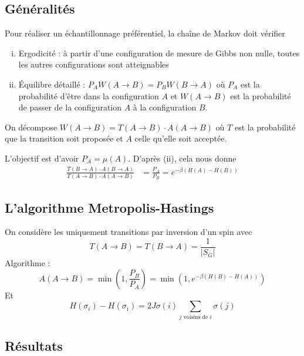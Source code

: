\documentclass[french]{beamer}
\begin{document}
\subsection{Généralités}

\begin{frame}
Pour réaliser un échantillonnage préférentiel, la chaîne de Markov doit vérifier
\begin{enumerate}[(i)]
	\item Ergodicité : à partir d'une configuration de mesure de Gibbs non nulle, toutes les autres configurations sont atteignables
	\item \'Equilibre détaillé : $P_AW(A \to B) = P_BW(B \to A)$ où $P_A$ est la probabilité d'être dans la configuration $A$ et $W(A \to B)$ est la probabilité de passer de la configuration $A$ à la configuration $B$.
\end{enumerate}
On décompose $W(A \to B) = T(A \to B) \cdot A(A \to B)$ où $T$ est la probabilité que la transition soit proposée et $A$ celle qu'elle soit acceptée.

L'objectif est d'avoir $P_A = \mu(A)$. D'après (ii), cela nous donne 
\begin{align*}
\frac{T(B \to A)\cdot A(B \to A)}{T(A\to B)\cdot A(A \to B)} &= \frac{P_A}{P_B} = e^{-\beta\left(H(A) - H(B)\right)}
\end{align*}
\end{frame}

%
\subsection{L'algorithme Metropolis-Hastings}
%

\begin{frame}
	On considère les uniquement transitions par inversion d'un spin avec \[T(A \to B) = T(B \to A) = \frac{1}{\left|S_G\right|}\]
	Algorithme  :
	\[
	A(A \to B) = \min\left(1, \frac{P_B}{P_A}\right) = \min\left(1, e^{-\beta(H(B) - H(A))}\right)
	\]
	Et
	\[
	H(\sigma_i) - H(\sigma_{\overline{\imath}}) = 2J\sigma(i) \sum_\text{$j$ voisins de $i$} \sigma(j)
	\]
\end{frame}

%
\subsection{Résultats}
%
\end{document}
